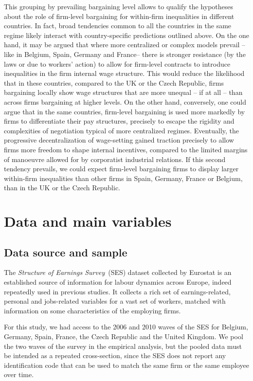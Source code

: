 \documentclass[12pt]{article}
\begin{document}
This grouping by prevailing bargaining level allows to qualify the hypotheses about the role of firm-level bargaining for within-firm inequalities in different countries. In fact, broad tendencies common to all the countries in the same regime likely interact with country-specific predictions outlined above. On the one hand, it may be argued that where more centralized or complex models prevail -- like in Belgium, Spain, Germany and France-- there is stronger resistance (by the laws or due to workers' action) to allow for firm-level contracts to introduce inequalities in the firm internal wage structure. This would reduce the likelihood that in these countries, compared to the UK or the Czech Republic, firms bargaining locally show wage structures that are more unequal -- if at all -- than across firms bargaining at higher levels. On the other hand, conversely, one could argue that in the same countries, firm-level bargaining is used more markedly by firms to differentiate their pay structures, precisely to escape the rigidity and complexities of negotiation typical of more centralized regimes. Eventually, the progressive decentralization of wage-setting gained traction precisely to allow firms more freedom to shape internal incentives, compared to the limited margins of manoeuvre allowed for by corporatist industrial relations. If this second tendency prevails, we could expect firm-level bargaining firms to display larger within-firm inequalities than other firms in Spain, Germany, France or Belgium, than in the UK or the Czech Republic.


\section*{Data and main variables}
\label{sec:data}

\subsection*{Data source and sample}
\label{sec:sources}
The \emph{Structure of Earnings Survey}~(SES) dataset collected by Eurostat is an established source of information for labour dynamics across Europe, indeed repeatedly used in previous studies. It collects a rich set of earnings-related, personal and jobs-related variables for a vast set of workers, matched with information on some characteristics of the employing firms.

For this study, we had access to the 2006 and 2010 waves of the SES for Belgium, Germany, Spain, France, the Czech Republic and the United Kingdom. We pool the two waves of the survey in the empirical analysis, but the pooled data must be intended as a repeated cross-section, since the SES does not report any identification code that can be used to match the same firm or the same employee over time.
\end{document}
